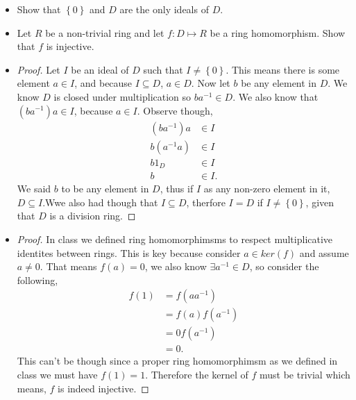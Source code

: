 \documentclass[11pt]{article}
\newenvironment{problem}[2][Problem\!]{\begin{trivlist}
\item[\hskip \labelsep {\bfseries #1}\hskip \labelsep {\bfseries #2}]}{\end{trivlist}}
\newcommand{\set}[1]{\left\{#1\right\}} %
\begin{document}
\begin{tcolorbox}
    \begin{problem} {10.2}
        \begin{itemize}
            \item[(a)] Show that $\set{0}$ and $D$ are the only ideals of $D$.
            \item[(b)] Let $R$ be a non-trivial ring and let $f: D\mapsto R$ be a ring homomorphism. Show that $f$ is injective. 
        \end{itemize}
    \end{problem}
\end{tcolorbox}
\begin{itemize}
    \item[(a)]
    \begin{proof}
        Let $I$ be an ideal of $D$ such that $I \neq \set{0}$. This means there is some element $a \in I$, and because $I \subseteq D$, $a \in D$. Now let $b$ be any element in $D$. We know $D$ is closed under multiplication so $ba^{-1} \in D$. We also know that $(ba^{-1})a \in I$, because $a \in I$. Observe though,
        \begin{align*}
            (ba^{-1})a &\in I \\
            b(a^{-1}a) &\in I \\
            b1_D &\in I \\
            b &\in I.
        \end{align*}
        We said $b$ to be any element in $D$, thus if $I$ as any non-zero element in it, $D \subseteq I$.Wwe also had though that $I \subseteq D$, therfore $I = D$ if $I \neq \set{0}$, given that $D$ is a division ring.
    \end{proof} 
    \item[(b)]
    \begin{proof}
        In class we defined ring homomorphimsms to respect multiplicative identites between rings. This is key because consider $a \in ker(f)$ and assume $a \neq 0$. That means $f(a) = 0$, we also know $\exists a^{-1} \in D$, so consider the following,
        \begin{align*}
            f(1) &= f(aa^{-1}) \\
            &= f(a)f(a^{-1}) \\
            &= 0f(a^{-1}) \\
            &= 0.
        \end{align*}
        This can't be though since a proper ring homomorphimsm as we defined in class we must have $f(1) = 1$. Therefore the kernel of $f$ must be trivial which means, $f$ is indeed injective.
    \end{proof} 
\end{itemize}
\end{document}
